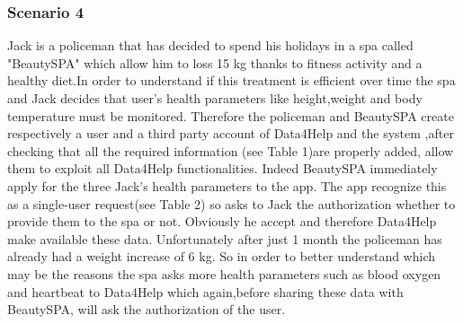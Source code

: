     \subsubsection{Scenario 4}

    Jack is a policeman that has decided to spend his holidays in a spa called "BeautySPA" which allow him to loss 15 kg thanks to fitness activity and a healthy diet.In order to understand if this treatment is efficient over time the spa and Jack decides that user's health parameters like height,weight and body temperature must be monitored. Therefore the policeman and BeautySPA create respectively a user and a third party account of Data4Help and the system ,after checking that all the required information (see Table 1)are properly added, allow them to exploit all Data4Help functionalities. Indeed  BeautySPA immediately apply for the three Jack's health parameters to the app. The app recognize this as a single-user request(see Table 2)  so asks to Jack the authorization whether to provide them to the spa or not. Obviously he accept and therefore Data4Help make available these data. Unfortunately after just 1 month the policeman has already had a weight increase of 6 kg. So in order to better understand which may be the reasons the spa asks more health parameters such as blood oxygen and heartbeat to Data4Help which again,before sharing these data with BeautySPA, will ask the authorization of the user.


